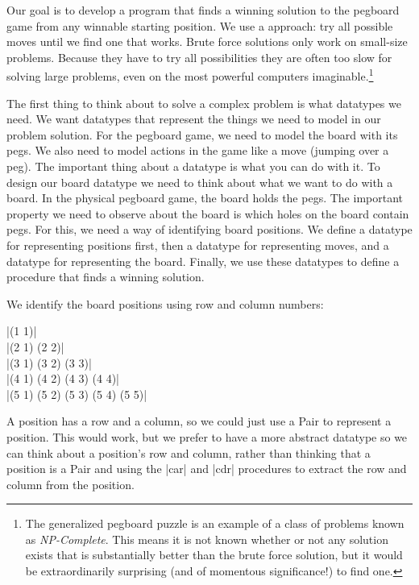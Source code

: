 \begin{schemeregion}
{Our goal is to develop a program that finds a winning solution to the pegboard game from any winnable starting position.  We use a  approach: try all possible moves until we find one that works.  Brute force solutions only work on small-size problems.  Because they have to try all possibilities they are often too slow for solving large problems, even on the most powerful computers imaginable.\footnote{The generalized pegboard puzzle is an example of a class of problems known as \emph{NP-Complete}.  This means it is not known whether or not any solution exists that is substantially better than the brute force solution, but it would be extraordinarily surprising (and of momentous significance!) to find one.} 

The first thing to think about to solve a complex problem is what datatypes we need.  We want datatypes that represent the things we need to model in our problem solution.  For the pegboard game, we need to model the board with its pegs.  We also need to model actions in the game like a move (jumping over a peg).  The important thing about a datatype is what you can do with it.  To design our board datatype we need to think about what we want to do with a board.  In the physical pegboard game, the board holds the pegs.  The important property we need to observe about the board is which holes on the board contain pegs.  For this, we need a way of identifying board positions.  We define a datatype for representing positions first, then a datatype for representing moves, and a datatype for representing the board.  Finally, we use these datatypes to define a procedure that finds a winning solution.

 We identify the board positions using row and column numbers:
\begin{center}
     \scheme|(1 1)|\\
    \scheme|(2 1) (2 2)|\\
   \scheme|(3 1) (3 2) (3 3)|\\ 
  \scheme|(4 1) (4 2) (4 3) (4 4)|\\
 \scheme|(5 1) (5 2) (5 3) (5 4) (5 5)|\\
\end{center}

A position has a row and a column, so we could just use a Pair to represent a position.  This would work, but we prefer to have a more abstract datatype so we can think about a position's row and column, rather than thinking that a position is a Pair and using the \scheme|car| and \scheme|cdr| procedures to extract the row and column from the position.  

}
\end{schemeregion}
